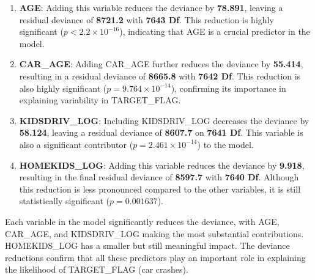 \documentclass[
]{article}
\begin{document}
\begin{enumerate}
\def\labelenumi{\arabic{enumi}.}
\item
  \textbf{AGE}: Adding this variable reduces the deviance by
  \textbf{78.891}, leaving a residual deviance of \textbf{8721.2} with
  \textbf{7643 Df}. This reduction is highly significant
  (\(p < 2.2 \times 10^{-16}\)), indicating that AGE is a crucial
  predictor in the model.
\item
  \textbf{CAR\_AGE}: Adding CAR\_AGE further reduces the deviance by
  \textbf{55.414}, resulting in a residual deviance of \textbf{8665.8}
  with \textbf{7642 Df}. This reduction is also highly significant
  (\(p = 9.764 \times 10^{-14}\)), confirming its importance in
  explaining variability in TARGET\_FLAG.
\item
  \textbf{KIDSDRIV\_LOG}: Including KIDSDRIV\_LOG decreases the deviance
  by \textbf{58.124}, leaving a residual deviance of \textbf{8607.7} on
  \textbf{7641 Df}. This variable is also a significant contributor
  (\(p = 2.461 \times 10^{-14}\)) to the model.
\item
  \textbf{HOMEKIDS\_LOG}: Adding this variable reduces the deviance by
  \textbf{9.918}, resulting in the final residual deviance of
  \textbf{8597.7} with \textbf{7640 Df}. Although this reduction is less
  pronounced compared to the other variables, it is still statistically
  significant (\(p = 0.001637\)).
\end{enumerate}

Each variable in the model significantly reduces the deviance, with AGE,
CAR\_AGE, and KIDSDRIV\_LOG making the most substantial contributions.
HOMEKIDS\_LOG has a smaller but still meaningful impact. The deviance
reductions confirm that all these predictors play an important role in
explaining the likelihood of TARGET\_FLAG (car crashes).
\end{document}
